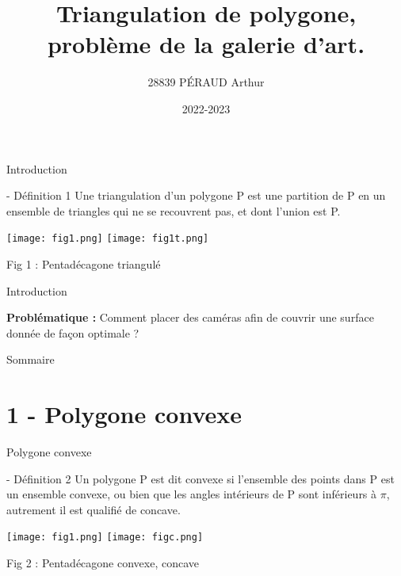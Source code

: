 \documentclass{beamer}
\title[Triangulation de polygone]{Triangulation de polygone, problème de la galerie d’art.}
\subtitle{}
\author{28839 PÉRAUD Arthur}
\institute{Épreuve de TIPE}
\date{2022-2023}
\begin{document}
\begin{frame}
\titlepage
\end{frame}
\begin{frame}{Introduction}
\begin{block}{- Définition 1}
  Une triangulation d'un polygone P est une partition de P en un ensemble de triangles qui ne se recouvrent pas, et dont l'union est P.
\end{block}
\begin{center}
    \texttt{[image: fig1.png]}
    \texttt{[image: fig1t.png]}
    
    Fig 1 : Pentadécagone triangulé
\end{center}
\end{frame}
\begin{frame}{Introduction}
\begin{center}
    \textbf{Problématique :} Comment placer des caméras afin de couvrir une surface donnée de façon optimale ?
\end{center}
\end{frame}
\begin{frame}{Sommaire}
\tableofcontents
\end{frame}


\section{1 - Polygone convexe}
\begin{frame}{Polygone convexe}
    \begin{block}{- Définition 2}
      Un polygone P est dit convexe si l'ensemble des points dans P est un ensemble convexe, ou bien que les angles intérieurs de P sont inférieurs à $\pi$, autrement il est qualifié de concave.
    \end{block}
    \begin{center}
        \texttt{[image: fig1.png]}
        \texttt{[image: figc.png]}
    
         Fig 2 : Pentadécagone convexe, concave
    \end{center}
\end{frame}
\end{document}
